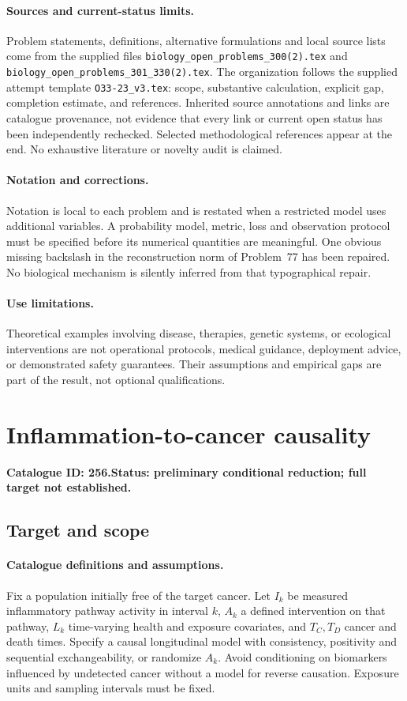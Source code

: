 \documentclass[11pt]{article}
\begin{document}
\paragraph{Sources and current-status limits.}
Problem statements, definitions, alternative formulations and local source lists
come from the supplied files
\texttt{biology\_open\_problems\_300(2).tex} and
\texttt{biology\_open\_problems\_301\_330(2).tex}.
The organization follows the supplied attempt template
\texttt{O33-23\_v3.tex}: scope, substantive calculation, explicit gap,
completion estimate, and references. Inherited source annotations and links are
catalogue provenance, not evidence that every link or current open status has
been independently rechecked. Selected methodological references appear at the
end. No exhaustive literature or novelty audit is claimed.

\paragraph{Notation and corrections.}
Notation is local to each problem and is restated when a restricted model uses
additional variables. A probability model, metric, loss and observation protocol
must be specified before its numerical quantities are meaningful. One obvious
missing backslash in the reconstruction norm of Problem~77 has been repaired.
No biological mechanism is silently inferred from that typographical repair.

\paragraph{Use limitations.}
Theoretical examples involving disease, therapies, genetic systems, or ecological
interventions are not operational protocols, medical guidance, deployment advice,
or demonstrated safety guarantees. Their assumptions and empirical gaps are part
of the result, not optional qualifications.

\setcounter{section}{255}
\section{Inflammation-to-cancer causality}
\label{prob:256}
\noindent\textbf{Catalogue ID: 256.}\quad \textbf{Status: preliminary conditional reduction; full target not established.}
\subsection{Target and scope}
\paragraph{Catalogue definitions and assumptions.}
Fix a population initially free of the target cancer. Let $I_k$ be measured inflammatory pathway activity in interval $k$, $A_k$ a defined intervention on that pathway, $L_k$ time-varying health and exposure covariates, and $T_C,T_D$ cancer and death times. Specify a causal longitudinal model with consistency, positivity and sequential exchangeability, or randomize $A_k$. Avoid conditioning on biomarkers influenced by undetected cancer without a model for reverse causation. Exposure units and sampling intervals must be fixed.
\end{document}
